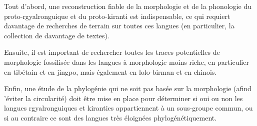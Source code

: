 \documentclass[oldfontcommands,oneside,a4paper,11pt]{article}
\begin{document}
Tout d'abord, une reconstruction fiable de la morphologie et de la phonologie du proto-rgyalronguique et du proto-kiranti est indispensable, ce qui requiert davantage de recherches de terrain sur toutes ces langues (en particulier, la collection de davantage de textes).

Ensuite, il est important de rechercher toutes les traces potentielles de morphologie fossilisée dans les langues à morphologie moins riche, en particulier en tibétain et en jingpo, mais également en lolo-birman et en chinois.

 Enfin, une étude de la phylogénie qui ne soit pas basée sur la morphologie (afind 'éviter la circularité) doit être mise en place pour déterminer si oui ou non les langues rgyalronguiques et kiranties appartiennent à un sous-groupe  commun, ou si au contraire ce sont des langues très éloignées phylogénétiquement.
 


\end{document}
